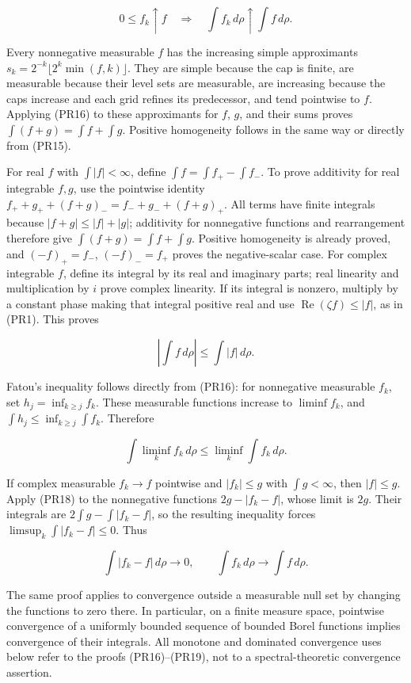\documentclass[
  11pt,
]{article}
\begin{document}
\[
0\leq f_k\uparrow f\quad\Longrightarrow\quad
\int f_k\,d\rho\uparrow\int f\,d\rho.
\tag{PR16}
\]

Every nonnegative measurable \(f\) has the increasing simple
approximants \(s_k=2^{-k}\lfloor2^k\min(f,k)\rfloor\). They are simple
because the cap is finite, are measurable because their level sets are
measurable, are increasing because the caps increase and each grid
refines its predecessor, and tend pointwise to \(f\). Applying (PR16) to
these approximants for \(f\), \(g\), and their sums proves
\(\int(f+g)=\int f+\int g\). Positive homogeneity follows in the same
way or directly from (PR15).

For real \(f\) with \(\int|f|<\infty\), define
\(\int f=\int f_+-\int f_-\). To prove additivity for real integrable
\(f,g\), use the pointwise identity \(f_++g_++(f+g)_-=f_-+g_-+(f+g)_+\).
All terms have finite integrals because \(|f+g|\leq|f|+|g|\); additivity
for nonnegative functions and rearrangement therefore give
\(\int(f+g)=\int f+\int g\). Positive homogeneity is already proved, and
\((-f)_+=f_-\), \((-f)_-=f_+\) proves the negative-scalar case. For
complex integrable \(f\), define its integral by its real and imaginary
parts; real linearity and multiplication by \(i\) prove complex
linearity. If its integral is nonzero, multiply by a constant phase
making that integral positive real and use
\(\operatorname{Re}(\zeta f)\leq|f|\), as in (PR1). This proves

\[
\left|\int f\,d\rho\right|\leq\int|f|\,d\rho.
\tag{PR17}
\]

Fatou's inequality follows directly from (PR16): for nonnegative
measurable \(f_k\), set \(h_j=\inf_{k\geq j}f_k\). These measurable
functions increase to \(\liminf f_k\), and
\(\int h_j\leq\inf_{k\geq j}\int f_k\). Therefore

\[
\int\liminf_k f_k\,d\rho\leq\liminf_k\int f_k\,d\rho.
\tag{PR18}
\]

If complex measurable \(f_k\to f\) pointwise and \(|f_k|\leq g\) with
\(\int g<\infty\), then \(|f|\leq g\). Apply (PR18) to the nonnegative
functions \(2g-|f_k-f|\), whose limit is \(2g\). Their integrals are
\(2\int g-\int|f_k-f|\), so the resulting inequality forces
\(\limsup_k\int|f_k-f|\leq0\). Thus

\[
\int|f_k-f|\,d\rho\longrightarrow0,
\qquad
\int f_k\,d\rho\longrightarrow\int f\,d\rho.
\tag{PR19}
\]

The same proof applies to convergence outside a measurable null set by
changing the functions to zero there. In particular, on a finite measure
space, pointwise convergence of a uniformly bounded sequence of bounded
Borel functions implies convergence of their integrals. All monotone and
dominated convergence uses below refer to the proofs (PR16)--(PR19), not
to a spectral-theoretic convergence assertion.
\end{document}
